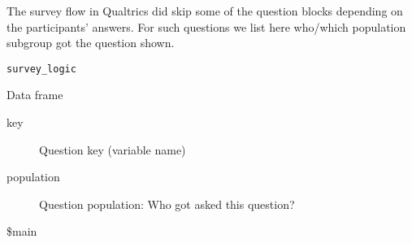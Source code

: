 
%
\begin{Description}
The survey flow in Qualtrics did skip some of the question blocks depending on
the participants' answers. For such questions we list here who/which population
subgroup got the question shown.
\end{Description}
%
\begin{Usage}
\begin{verbatim}
survey_logic
\end{verbatim}
\end{Usage}
%
\begin{Format}
Data frame
\begin{description}

\item[key] Question key (variable name)
\item[population] Question population: Who got asked this question?

\end{description}

\end{Format}
%
\begin{SeeAlso}
\$main
\end{SeeAlso}


